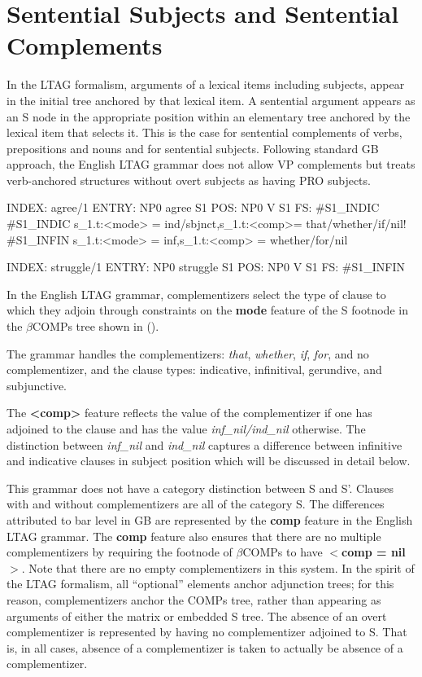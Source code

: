 \section{Sentential Subjects and Sentential Complements}

In the LTAG formalism,  arguments of a lexical items including
subjects, appear in the initial tree anchored by that lexical item.  A
sentential argument appears  as an S node in the appropriate
position within an elementary tree anchored by the lexical item that
selects it. This is the case for sentential
complements of verbs, prepositions and nouns and for sentential
subjects. Following standard GB approach, the English LTAG grammar
does not allow VP complements but treats verb-anchored structures
without overt subjects as having PRO subjects.  

INDEX:  agree/1
ENTRY:  NP0 agree S1
POS:    NP0 V S1
FS:     #S1_INDIC
#S1_INDIC       s_1.t:<mode> = ind/sbjnct,s_1.t:<comp>= that/whether/if/nil!
#S1_INFIN       s_1.t:<mode> = inf,s_1.t:<comp> = whether/for/nil

INDEX:  struggle/1
ENTRY:  NP0 struggle S1
POS:    NP0 V S1
FS:     #S1_INFIN


In the English LTAG grammar, complementizers select the type of clause
to which they adjoin through constraints on the {\bf mode} feature
of the S footnode in the $\beta$COMPs tree shown in ().

The grammar handles the complementizers: {\it that\/}, {\it
whether\/}, {\it if\/}, {\it for\/}, and no complementizer, and the
clause types: indicative, infinitival, gerundive, and subjunctive.

The  {\bf
<comp>} feature reflects the value of the complementizer if one has
adjoined to the clause and has the value {\it inf_nil/ind_nil}
otherwise. The distinction between {\it inf_nil} and {\it ind_nil}
captures a difference between infinitive and indicative clauses in
subject position which will be discussed in detail below.  


 This grammar does not have a category distinction between S and
S'. Clauses with and without complementizers are all of the category
S. The differences attributed to bar level in GB are represented by
the {\bf comp} feature in the English LTAG grammar.  The {\bf
comp} feature also ensures that there are no multiple
complementizers by requiring the footnode of $\beta$COMPs to have {\bf
$<$comp = nil$>$}.  Note that there are no empty
complementizers in this system. In the spirit of the LTAG formalism,
all ``optional'' elements anchor adjunction trees; for this reason,
complementizers anchor the COMPs tree, rather than appearing as
arguments of either the matrix or embedded S tree.  The absence of an overt complementizer
is represented by having no complementizer adjoined to S. That is, in
all cases, absence of a complementizer is taken to actually be absence
of a complementizer.

